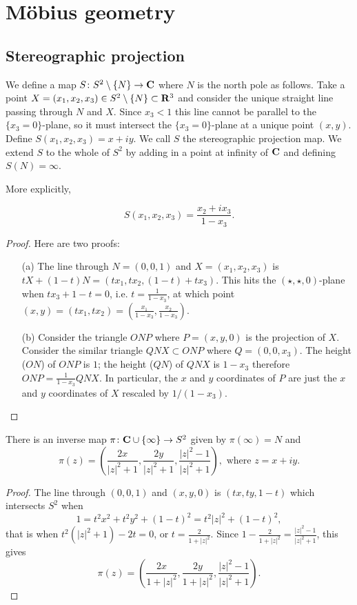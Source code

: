 \documentclass[12pt]{article}
\begin{document}
\newpage

\section{M\"obius geometry}

\subsection{Stereographic projection}

\begin{dfn}
  We define a map $S\colon S^2\setminus\{N\}\to\mathbf{C}$ where $N$ is the north pole as follows. Take a point $X=(x_1,x_2,x_3)\in S^2\setminus\{N\}\subset\mathbf{R}^3$ and consider the unique straight line passing through $N$ and $X$. Since $x_3<1$ this line cannot be parallel to the $\{x_3=0\}$-plane, so it must intersect the $\{x_3=0\}$-plane at a unique point $(x,y)$. Define $S(x_1,x_2,x_3)=x+iy$. We call $S$ the stereographic projection map. We extend $S$ to the whole of $S^2$ by adding in a point at infinity of $\mathbf{C}$ and defining $S(N)=\infty$.
\end{dfn}

More explicitly,

\begin{lma}
  \[S(x_1,x_2,x_3)=\frac{x_2+ix_3}{1-x_3}.\]
\end{lma}
\begin{proof}
  Here are two proofs:
  \begin{enumerate}
  \item[(a)] The line through $N=(0,0,1)$ and $X=(x_1,x_2,x_3)$ is $tX+(1-t)N=(tx_1,tx_2,(1-t)+tx_3)$. This hits the $(\star,\star,0)$-plane when $tx_3+1-t=0$, i.e. $t=\frac{1}{1-x_3}$, at which point $(x,y)=(tx_1,tx_2)=\left(\frac{x_1}{1-x_3},\frac{x_2}{1-x_3}\right)$.
  \item[(b)] Consider the triangle $ONP$ where $P=(x,y,0)$ is the projection of $X$. Consider the similar triangle $QNX\subset ONP$ where $Q=(0,0,x_3)$. The height ($ON$) of $ONP$ is $1$; the height ($QN$) of $QNX$ is $1-x_3$ therefore $ONP=\frac{1}{1-x_3}QNX$. In particular, the $x$ and $y$ coordinates of $P$ are just the $x$ and $y$ coordinates of $X$ rescaled by $1/(1-x_3)$.
  \end{enumerate}
\end{proof}

\begin{lma}
  There is an inverse map $\pi\colon\mathbf{C}\cup\{\infty\}\to S^2$ given by $\pi(\infty)=N$ and
  \[\pi(z)=\left(\frac{2x}{|z|^2+1},\frac{2y}{|z|^2+1},\frac{|z|^2-1}{|z|^2+1}\right),\mbox{ where }z=x+iy.\]
\end{lma}
\begin{proof}
  The line through $(0,0,1)$ and $(x,y,0)$ is $(tx,ty,1-t)$ which intersects $S^2$ when
  \[1=t^2x^2+t^2y^2+(1-t)^2=t^2|z|^2+(1-t)^2,\]
  that is when $t^2(|z|^2+1)-2t=0$, or $t=\frac{2}{1+|z|^2}$. Since $1-\frac{2}{1+|z|^2}=\frac{|z|^2-1}{|z|^2+1}$, this gives
  \[\pi(z)=\left(\frac{2x}{1+|z|^2},\frac{2y}{1+|z|^2},\frac{|z|^2-1}{|z|^2+1}\right).\]
\end{proof}
\end{document}
